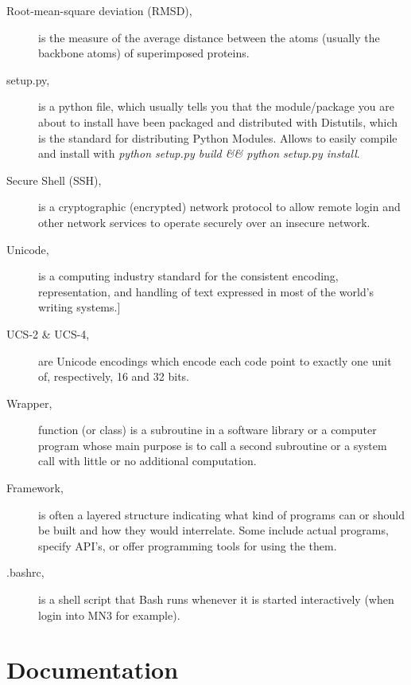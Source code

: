 \begin{description}
\item [Root-mean-square deviation (RMSD),] is the measure of the average distance between the atoms (usually the backbone atoms) of superimposed proteins.
\item [setup.py,] is a python file, which usually tells you that the module/package you are about to install have been packaged and distributed with Distutils, which is the standard for distributing Python Modules. Allows to easily compile and install with \textit{python setup.py build \&\& python setup.py install}.
\item [Secure Shell (SSH),]  is a cryptographic (encrypted) network protocol to allow remote login and other network services to operate securely over an insecure network. 
\item [Unicode,] is a computing industry standard for the consistent encoding, representation, and handling of text expressed in most of the world's writing systems.]
\item [UCS-2 \& UCS-4, ] are Unicode encodings which encode each code point to exactly one unit of, respectively, 16 and 32 bits. 
\item [Wrapper,]  function (or class) is a subroutine in a software library or a computer program whose main purpose is to call a second subroutine or a system call with little or no additional computation. 



\item[Framework,] is often a layered structure indicating what kind of programs can or should be built and how they would interrelate. Some include actual programs, specify API's, or offer programming tools for using the them.

\item [.bashrc,] is a shell script that Bash runs whenever it is started interactively (when login into MN3 for example).
\end{description}



\chapter{Documentation}
\label{sec:docs}

